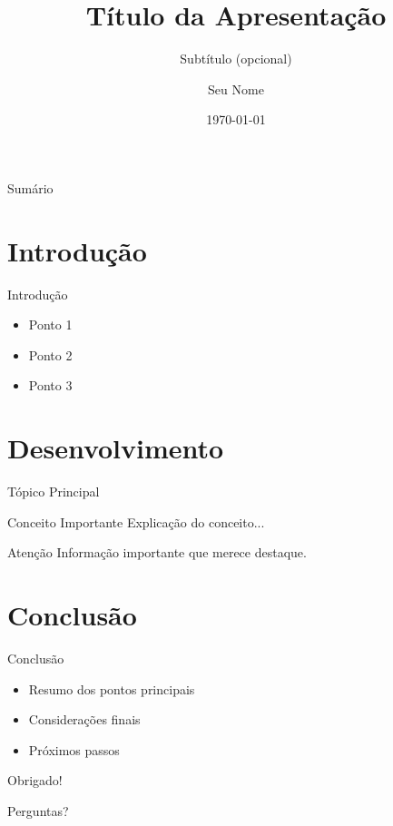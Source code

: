 \documentclass{beamer}
\title{Título da Apresentação}
\subtitle{Subtítulo (opcional)}
\author{Seu Nome}
\institute{Newton Paiva}
\date{\today}
\begin{document}
\begin{frame}
    \titlepage
\end{frame}

\begin{frame}{Sumário}
    \tableofcontents
\end{frame}

\section{Introdução}
\begin{frame}{Introdução}
    \begin{itemize}
        \item Ponto 1
        \item Ponto 2
        \item Ponto 3
    \end{itemize}
\end{frame}

\section{Desenvolvimento}
\begin{frame}{Tópico Principal}
    \begin{block}{Conceito Importante}
        Explicação do conceito...
    \end{block}
    
    \begin{alertblock}{Atenção}
        Informação importante que merece destaque.
    \end{alertblock}
\end{frame}

\section{Conclusão}
\begin{frame}{Conclusão}
    \begin{itemize}
        \item Resumo dos pontos principais
        \item Considerações finais
        \item Próximos passos
    \end{itemize}
\end{frame}

\begin{frame}
    \begin{center}
        \Huge{Obrigado!}
        \vspace{1cm}
        
        \Large{Perguntas?}
    \end{center}
\end{frame}
\end{document}
